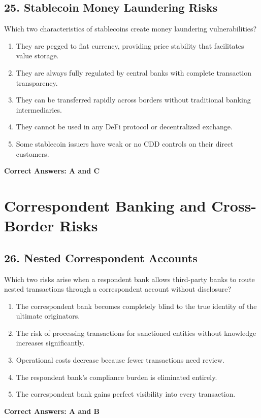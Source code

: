 \documentclass[11pt,a4paper]{article}
\begin{document}
	\subsection{25. Stablecoin Money Laundering Risks}
	Which two characteristics of stablecoins create money laundering vulnerabilities?
	\begin{enumerate}[label=\Alph*.]
		\item They are pegged to fiat currency, providing price stability that facilitates value storage.
		\item They are always fully regulated by central banks with complete transaction transparency.
		\item They can be transferred rapidly across borders without traditional banking intermediaries.
		\item They cannot be used in any DeFi protocol or decentralized exchange.
		\item Some stablecoin issuers have weak or no CDD controls on their direct customers.
	\end{enumerate}
	\textbf{Correct Answers: A and C}
	
	\section{Correspondent Banking and Cross-Border Risks}
	
	\subsection{26. Nested Correspondent Accounts}
	Which two risks arise when a respondent bank allows third-party banks to route nested transactions through a correspondent account without disclosure?
	\begin{enumerate}[label=\Alph*.]
		\item The correspondent bank becomes completely blind to the true identity of the ultimate originators.
		\item The risk of processing transactions for sanctioned entities without knowledge increases significantly.
		\item Operational costs decrease because fewer transactions need review.
		\item The respondent bank's compliance burden is eliminated entirely.
		\item The correspondent bank gains perfect visibility into every transaction.
	\end{enumerate}
	\textbf{Correct Answers: A and B}
	
\end{document}

